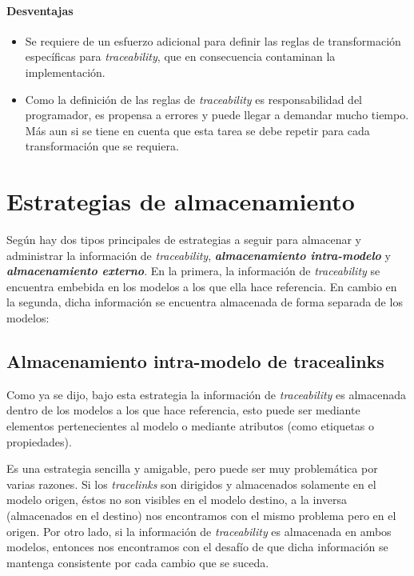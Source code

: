 \documentclass[a4paper,12pt,twoside,spanish,openright]{book}
\begin{document}
\paragraph{Desventajas}

\begin{itemize}[label={$\times$}]

\item Se requiere de un esfuerzo adicional para definir las reglas de transformación específicas para \textit{traceability}, que en consecuencia contaminan la implementación.

\item Como la definición de las reglas de \textit{traceability} es responsabilidad del programador, es propensa a errores y puede llegar a demandar mucho tiempo. Más aun si se tiene en cuenta que esta tarea se debe repetir para cada transformación que se requiera.

\end{itemize}


\section{Estrategias de almacenamiento}

Según \cite{DrivalosPaigeFernandesKolovos} hay dos tipos principales de estrategias a seguir para almacenar y administrar la información de \textit{traceability}, \textit{\textbf{almacenamiento intra-modelo}} y \textit{\textbf{almacenamiento externo}}. En la primera, la información de \textit{traceability} se encuentra embebida en los modelos a los que ella hace referencia. En cambio en la segunda, dicha información se encuentra almacenada de forma separada de los modelos:

\subsection{Almacenamiento intra-modelo de tracealinks}

Como ya se dijo, bajo esta estrategia la información de \textit{traceability} es almacenada dentro de los modelos a los que hace referencia, esto puede ser mediante elementos pertenecientes al modelo o mediante atributos (como etiquetas o propiedades).

Es una estrategia sencilla y amigable, pero puede ser muy problemática por varias razones. Si los \textit{tracelinks} son dirigidos y almacenados solamente en el modelo origen, éstos no son visibles en el modelo destino, a la inversa (almacenados en el destino) nos encontramos con el mismo problema pero en el origen. Por otro lado, si la información de \textit{traceability} es almacenada en ambos modelos, entonces nos encontramos con el desafío de que dicha información se mantenga consistente por cada cambio que se suceda.
\end{document}
